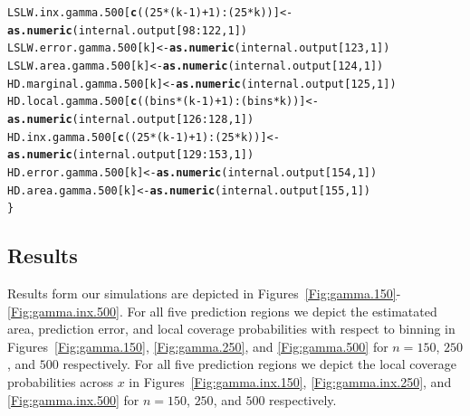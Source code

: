 \documentclass[11pt]{article}\usepackage[]{graphicx}\usepackage[]{color}
\makeatletter
\newcommand{\hlnum}[1]{\textcolor[rgb]{0.686,0.059,0.569}{#1}}%
\newcommand{\hlopt}[1]{\textcolor[rgb]{0,0,0}{#1}}%
\newcommand{\hlstd}[1]{\textcolor[rgb]{0.345,0.345,0.345}{#1}}%
\newcommand{\hlkwb}[1]{\textcolor[rgb]{0.69,0.353,0.396}{#1}}%
\newcommand{\hlkwd}[1]{\textcolor[rgb]{0.737,0.353,0.396}{\textbf{#1}}}%
\newenvironment{kframe}{%
 \def\at@end@of@kframe{}%
 \ifinner\ifhmode%
  \def\at@end@of@kframe{\end{minipage}}%
  \begin{minipage}{\columnwidth}%
 \fi\fi%
 \def\FrameCommand##1{\hskip\@totalleftmargin \hskip-\fboxsep
 \colorbox{shadecolor}{##1}\hskip-\fboxsep
     \hskip-\linewidth \hskip-\@totalleftmargin \hskip\columnwidth}%
 \MakeFramed {\advance\hsize-\width
   \@totalleftmargin\z@ \linewidth\hsize
   \@setminipage}}%
 {\par\unskip\endMakeFramed%
 \at@end@of@kframe}
\newenvironment{knitrout}{}{} %
\makeatother
\begin{document}
\begin{knitrout}
\begin{kframe}
\begin{alltt}
  \hlstd{LSLW.inx.gamma.500[}\hlkwd{c}\hlstd{((}\hlnum{25}\hlopt{*}\hlstd{(k}\hlopt{-}\hlnum{1}\hlstd{)}\hlopt{+}\hlnum{1}\hlstd{)}\hlopt{:}\hlstd{(}\hlnum{25}\hlopt{*}\hlstd{k))]} \hlkwb{<-}
    \hlkwd{as.numeric}\hlstd{(internal.output[}\hlnum{98}\hlopt{:}\hlnum{122}\hlstd{,} \hlnum{1}\hlstd{])}
  \hlstd{LSLW.error.gamma.500[k]} \hlkwb{<-} \hlkwd{as.numeric}\hlstd{(internal.output[}\hlnum{123}\hlstd{,} \hlnum{1}\hlstd{])}
  \hlstd{LSLW.area.gamma.500[k]} \hlkwb{<-} \hlkwd{as.numeric}\hlstd{(internal.output[}\hlnum{124}\hlstd{,} \hlnum{1}\hlstd{])}
  \hlstd{HD.marginal.gamma.500[k]} \hlkwb{<-} \hlkwd{as.numeric}\hlstd{(internal.output[}\hlnum{125}\hlstd{,} \hlnum{1}\hlstd{])}
  \hlstd{HD.local.gamma.500[}\hlkwd{c}\hlstd{((bins}\hlopt{*}\hlstd{(k}\hlopt{-}\hlnum{1}\hlstd{)}\hlopt{+}\hlnum{1}\hlstd{)}\hlopt{:}\hlstd{(bins}\hlopt{*}\hlstd{k))]} \hlkwb{<-}
    \hlkwd{as.numeric}\hlstd{(internal.output[}\hlnum{126}\hlopt{:}\hlnum{128}\hlstd{,} \hlnum{1}\hlstd{])}
  \hlstd{HD.inx.gamma.500[}\hlkwd{c}\hlstd{((}\hlnum{25}\hlopt{*}\hlstd{(k}\hlopt{-}\hlnum{1}\hlstd{)}\hlopt{+}\hlnum{1}\hlstd{)}\hlopt{:}\hlstd{(}\hlnum{25}\hlopt{*}\hlstd{k))]} \hlkwb{<-}
    \hlkwd{as.numeric}\hlstd{(internal.output[}\hlnum{129}\hlopt{:}\hlnum{153}\hlstd{,} \hlnum{1}\hlstd{])}
  \hlstd{HD.error.gamma.500[k]} \hlkwb{<-} \hlkwd{as.numeric}\hlstd{(internal.output[}\hlnum{154}\hlstd{,} \hlnum{1}\hlstd{])}
  \hlstd{HD.area.gamma.500[k]} \hlkwb{<-} \hlkwd{as.numeric}\hlstd{(internal.output[}\hlnum{155}\hlstd{,} \hlnum{1}\hlstd{])}
\hlstd{\}}
\end{alltt}
\end{kframe}
\end{knitrout}




\newpage
\subsection{Results}
\label{sec:Gamma-Results}

Results form our simulations are depicted in 
Figures~\ref{Fig:gamma.150}-\ref{Fig:gamma.inx.500}.  
For all five prediction regions we depict the estimatated area, prediction 
error, and local coverage probabilities with respect to binning in 
Figures~\ref{Fig:gamma.150}, \ref{Fig:gamma.250}, and \ref{Fig:gamma.500} 
for $n = 150$, $250$, and $500$ respectively.  For all five prediction 
regions we depict the local coverage probabilities across $x$ in
Figures~\ref{Fig:gamma.inx.150}, \ref{Fig:gamma.inx.250}, and 
\ref{Fig:gamma.inx.500} for $n = 150$, $250$, and $500$ respectively.
\end{document}

